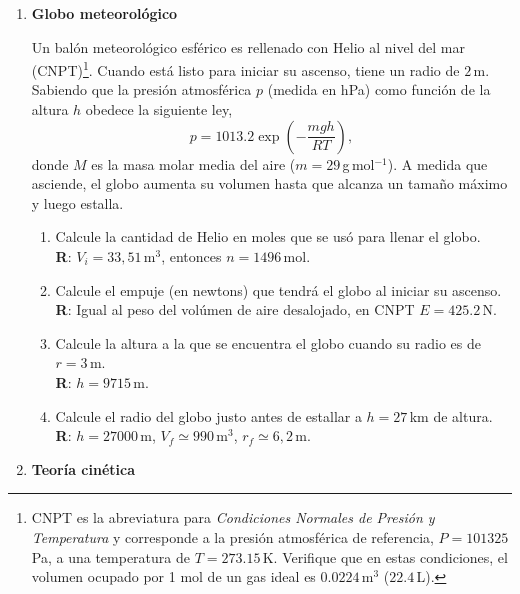 \documentclass[a4paper,12pt]{article}
\begin{document}
\begin{enumerate}
	\item {\bf{Globo meteorológico}}
		
		Un balón meteorológico esférico es rellenado con Helio al nivel del mar
		(CNPT)\footnote{CNPT es la abreviatura para {\textit{Condiciones
		Normales de Presión y Temperatura}} y corresponde a la presión
		atmosférica de referencia, $P=101325$\,Pa, a una temperatura de
		$T=273.15$\,K. Verifique que en estas condiciones, el volumen ocupado
		por 1 mol de un gas ideal es $0.0224$\,m$^3$ ($22.4$\,L).}.  Cuando
		está listo para iniciar su ascenso, tiene un radio de $2$\,m.  Sabiendo
		que la presión atmosférica $p$ (medida en hPa) como función de la
		altura $h$ obedece la siguiente ley, \[ p = 1013.2 \exp \left (
		-\frac{mgh}{RT} \right ),\] donde $M$ es la masa molar media del aire
		($m=29$\,g\,mol$^{-1}$). A medida que asciende, el globo aumenta su
		volumen hasta que alcanza un tamaño máximo y luego estalla. 
		\begin{enumerate}
			\item Calcule la cantidad de Helio en moles que se usó para llenar
				el globo.
				\\{\bf R}: $V_i=33,51$\,m$^3$, entonces $n=1496$\,mol.
			\item Calcule el empuje (en newtons) que tendrá el globo al iniciar
				su ascenso. 
				\\{\bf R}: Igual al peso del volúmen de aire desalojado, en
				CNPT $E=425.2$\,N.
			\item Calcule la altura a la que se encuentra el globo cuando su
				radio es de $r=3$\,m.
				\\{\bf R}: $h=9715$\,m.
			\item Calcule el radio del globo justo antes de estallar a
				$h=27$\,km de altura.
				\\{\bf R}: $h=27000$\,m, $V_f \simeq 990$\,m$^3$, $r_f \simeq 6,2$\,m.
		\end{enumerate}

	\item {\bf{Teoría cinética}}


\end{enumerate}
\end{document}
